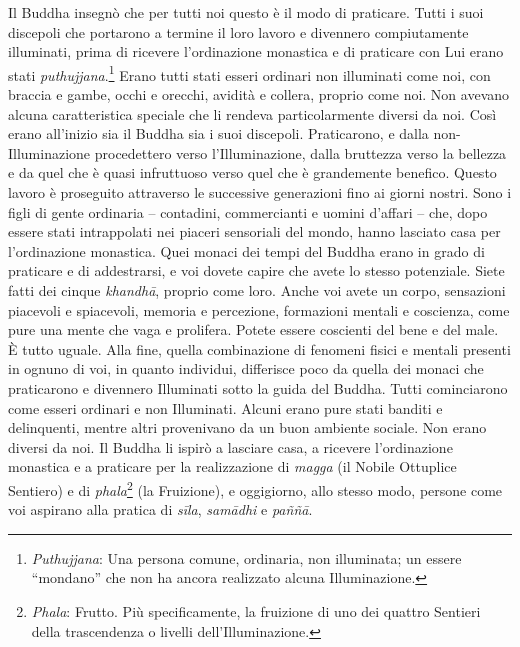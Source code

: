 Il Buddha insegnò che per tutti noi questo è il modo di praticare. Tutti
i suoi discepoli che portarono a termine il loro lavoro e divennero
compiutamente illuminati, prima di ricevere l'ordinazione monastica e di
praticare con Lui erano stati \emph{puthujjana}.\footnote{\emph{Puthujjana}:
  Una persona comune, ordinaria, non illuminata; un essere ``mondano''
  che non ha ancora realizzato alcuna Illuminazione.} Erano tutti stati
esseri ordinari non illuminati come noi, con braccia e gambe, occhi e
orecchi, avidità e collera, proprio come noi. Non avevano alcuna
caratteristica speciale che li rendeva particolarmente diversi da noi.
Così erano all'inizio sia il Buddha sia i suoi discepoli. Praticarono, e
dalla non-Illuminazione procedettero verso l'Illuminazione, dalla
bruttezza verso la bellezza e da quel che è quasi infruttuoso verso quel
che è grandemente benefico. Questo lavoro è proseguito attraverso le
successive generazioni fino ai giorni nostri. Sono i figli di gente
ordinaria -- contadini, commercianti e uomini d'affari -- che, dopo
essere stati intrappolati nei piaceri sensoriali del mondo, hanno
lasciato casa per l'ordinazione monastica. Quei monaci dei tempi del
Buddha erano in grado di praticare e di addestrarsi, e voi dovete capire
che avete lo stesso potenziale. Siete fatti dei cinque \emph{khandhā},
proprio come loro. Anche voi avete un corpo, sensazioni piacevoli e
spiacevoli, memoria e percezione, formazioni mentali e coscienza, come
pure una mente che vaga e prolifera. Potete essere coscienti del bene e
del male. È tutto uguale. Alla fine, quella combinazione di fenomeni
fisici e mentali presenti in ognuno di voi, in quanto individui,
differisce poco da quella dei monaci che praticarono e divennero
Illuminati sotto la guida del Buddha. Tutti cominciarono come esseri
ordinari e non Illuminati. Alcuni erano pure stati banditi e
delinquenti, mentre altri provenivano da un buon ambiente sociale. Non
erano diversi da noi. Il Buddha li ispirò a lasciare casa, a ricevere
l'ordinazione monastica e a praticare per la realizzazione di
\emph{magga} (il Nobile Ottuplice Sentiero) e di \emph{phala}\footnote{\emph{Phala}:
  Frutto. Più specificamente, la fruizione di uno dei quattro Sentieri
  della trascendenza o livelli dell'Illuminazione.} (la Fruizione), e
oggigiorno, allo stesso modo, persone come voi aspirano alla pratica di
\emph{sīla}, \emph{samādhi} e \emph{paññā}.

